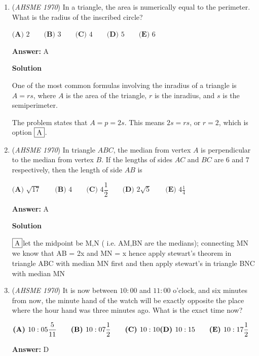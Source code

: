 \begin{enumerate}
 


	\item (\textit{AHSME 1970}) In a triangle, the area is numerically equal to the perimeter. What is the radius of the inscribed circle?


 $\textbf{(A) }2\qquad \textbf{(B) }3\qquad \textbf{(C) }4\qquad \textbf{(D) }5\qquad  \textbf{(E) }6$

 \textbf{Answer: }A



\textbf{Solution}

One of the most common formulas involving the inradius of a triangle is $A = rs$, where $A$ is the area of the triangle, $r$ is the inradius, and $s$ is the semiperimeter.

 The problem states that $A = p = 2s$.  This means $2s = rs$, or $r = 2$, which is option $\fbox{A}$.

 


	\item (\textit{AHSME 1970}) In triangle $ABC$, the median from vertex $A$ is perpendicular to the median from vertex $B$. 
If the lengths of sides $AC$ and $BC$ are $6$ and $7$ respectively, then the length of side $AB$ is


 $\textbf{(A) }\sqrt{17}\qquad \textbf{(B) }4\qquad \textbf{(C) }4\dfrac{1}{2}\qquad \textbf{(D) }2\sqrt{5}\qquad \textbf{(E) }4\frac{1}{4}$

 \textbf{Answer: }A



\textbf{Solution}

$\fbox{A}$let the midpoint be M,N ( i.e. AM,BN are the medians); connecting MN we know that AB = 2x and MN = x hence apply stewart's theorem in triangle ABC with median MN first and then apply stewart's in triangle BNC with median MN

 


	\item (\textit{AHSME 1970}) It is now between $10:00$ and $11:00$ o'clock, and six minutes from now, the minute hand of the 
watch will be exactly opposite the place where the hour hand was three minutes ago. What is the exact time now?


 $\textbf{(A) }10:05\dfrac{5}{11}\qquad \textbf{(B) }10:07\dfrac{1}{2}\qquad \textbf{(C) }10:10\qquad\\ \textbf{(D) }10:15\qquad \textbf{(E) }10:17\dfrac{1}{2}$

 \textbf{Answer: }D




\end{enumerate}
